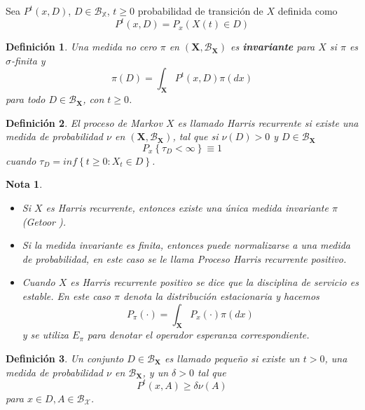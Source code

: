 \documentclass{article}
\newtheorem{Def}{Definición}
\newtheorem{Note}{Nota}
\begin{document}
Sea $P^{t}\left(x,D\right)$, $D\in\mathcal{B}_{\mathbb{X}}$, $t\geq0$ probabilidad de transici\'on de $X$ definida como \[P^{t}\left(x,D\right)=P_{x}\left(X\left(t\right)\in D\right)\]


\begin{Def}
Una medida no cero $\pi$ en $\left(\mathbf{X},\mathcal{B}_{\mathbf{X}}\right)$ es {\bf invariante} para $X$ si $\pi$ es $\sigma$-finita y \[\pi\left(D\right)=\int_{\mathbf{X}}P^{t}\left(x,D\right)\pi\left(dx\right)\] para todo $D\in \mathcal{B}_{\mathbf{X}}$, con $t\geq0$.
\end{Def}

\begin{Def}
El proceso de Markov $X$ es llamado Harris recurrente si existe una medida de probabilidad $\nu$ en $\left(\mathbf{X},\mathcal{B}_{\mathbf{X}}\right)$, tal que si $\nu\left(D\right)>0$ y $D\in\mathcal{B}_{\mathbf{X}}$ \[P_{x}\left\{\tau_{D}<\infty\right\}\equiv1\] cuando $\tau_{D}=inf\left\{t\geq0:X_{t}\in D\right\}$.
\end{Def}

\begin{Note}
\begin{itemize}
\item[i)] Si $X$ es Harris recurrente, entonces existe una \'unica medida invariante $\pi$ (Getoor \cite{Getoor}).

\item[ii)] Si la medida invariante es finita, entonces puede normalizarse a una medida de probabilidad, en este caso se le
llama Proceso {\em Harris recurrente positivo}.

\item[iii)] Cuando $X$ es Harris recurrente positivo se dice que la disciplina de servicio es estable. En este caso $\pi$ denota la distribuci\'on estacionaria y hacemos \[P_{\pi}\left(\cdot\right)=\int_{\mathbf{X}}P_{x}\left(\cdot\right)\pi\left(dx\right)\] y se utiliza $E_{\pi}$ para denotar el operador esperanza correspondiente.
\end{itemize}
\end{Note}

\begin{Def}\label{Def.Cto.Peq.}
Un conjunto $D\in\mathcal{B_{\mathbf{X}}}$ es llamado peque\~no si existe un $t>0$, una medida de probabilidad $\nu$ en $\mathcal{B_{\mathbf{X}}}$, y un $\delta>0$ tal que \[P^{t}\left(x,A\right)\geq\delta\nu\left(A\right)\] para $x\in D,A\in\mathcal{B_{X}}$.
\end{Def}
\end{document}
